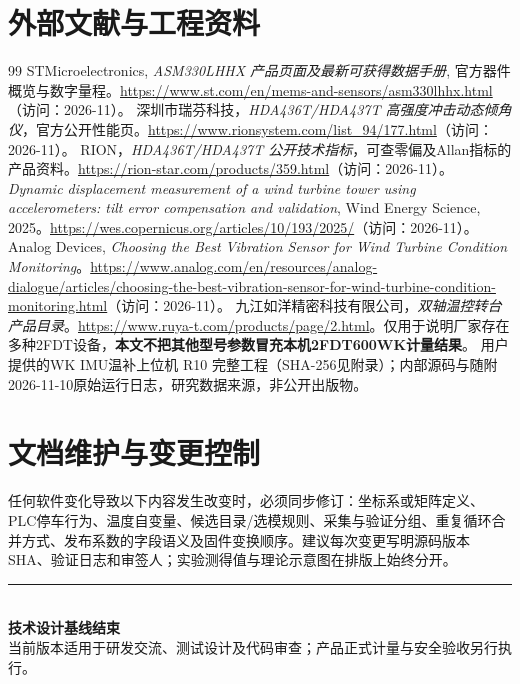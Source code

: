 \documentclass[UTF8,a4paper,11pt,oneside,openany,fontset=none]{ctexbook}
\begin{document}
\chapter{外部文献与工程资料}
\begin{thebibliography}{99}
 STMicroelectronics, \emph{ASM330LHHX 产品页面及最新可获得数据手册}, 官方器件概览与数字量程。\url{https://www.st.com/en/mems-and-sensors/asm330lhhx.html}（访问：2026-11）。
 深圳市瑞芬科技，\emph{HDA436T/HDA437T 高强度冲击动态倾角仪}，官方公开性能页。\url{https://www.rionsystem.com/list_94/177.html}（访问：2026-11）。
 RION，\emph{HDA436T/HDA437T 公开技术指标}，可查零偏及Allan指标的产品资料。\url{https://rion-star.com/products/359.html}（访问：2026-11）。
 \emph{Dynamic displacement measurement of a wind turbine tower using accelerometers: tilt error compensation and validation}, Wind Energy Science, 2025。\url{https://wes.copernicus.org/articles/10/193/2025/}（访问：2026-11）。
 Analog Devices, \emph{Choosing the Best Vibration Sensor for Wind Turbine Condition Monitoring}。\url{https://www.analog.com/en/resources/analog-dialogue/articles/choosing-the-best-vibration-sensor-for-wind-turbine-condition-monitoring.html}（访问：2026-11）。
 九江如洋精密科技有限公司，\emph{双轴温控转台产品目录}。\url{https://www.ruya-t.com/products/page/2.html}。仅用于说明厂家存在多种2FDT设备，\textbf{本文不把其他型号参数冒充本机2FDT600WK计量结果}。
 用户提供的WK IMU温补上位机 R10 完整工程（SHA-256见附录）；内部源码与随附2026-11-10原始运行日志，研究数据来源，非公开出版物。
\end{thebibliography}

\backmatter
\chapter*{文档维护与变更控制}
任何软件变化导致以下内容发生改变时，必须同步修订：坐标系或矩阵定义、PLC停车行为、温度自变量、候选目录/选模规则、采集与验证分组、重复循环合并方式、发布系数的字段语义及固件变换顺序。建议每次变更写明源码版本SHA、验证日志和审签人；实验测得值与理论示意图在排版上始终分开。

\begin{center}\vspace{10mm}\color{muted}\rule{0.7\linewidth}{0.5pt}\\[3mm]
{\large\bfseries 技术设计基线结束}\\[1mm]
当前版本适用于研发交流、测试设计及代码审查；产品正式计量与安全验收另行执行。
\end{center}
\end{document}
